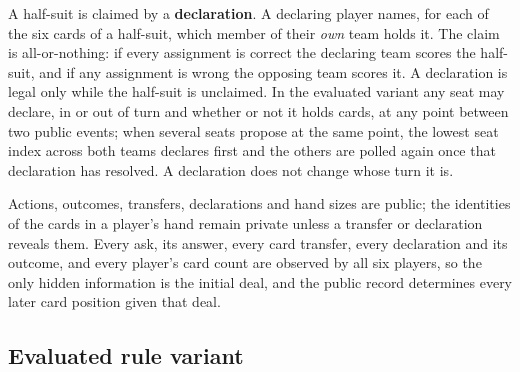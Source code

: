 A half-suit is claimed by a \textbf{declaration}. A declaring player names, for each of the six cards
of a half-suit, which member of their \emph{own} team holds it. The claim is all-or-nothing: if every
assignment is correct the declaring team scores the half-suit, and if any assignment is wrong the
opposing team scores it. A declaration is legal only while the half-suit is unclaimed. In the evaluated variant any seat
may declare, in or out of turn and whether or not it holds cards, at any point between two public
events; when several seats propose at the same point, the lowest seat index across both teams
declares first and the others are polled again once that declaration has resolved. A declaration
does not change whose turn it is.

Actions, outcomes, transfers, declarations and hand sizes are public; the identities of the cards
in a player's hand remain private unless a transfer or declaration reveals them. Every ask, its
answer, every card transfer, every declaration and its outcome, and every player's card count are
observed by all six players, so the only hidden information is the initial deal, and the public
record determines every later card position given that deal.

\subsection{Evaluated rule variant}
\label{sec:game-dialect}

